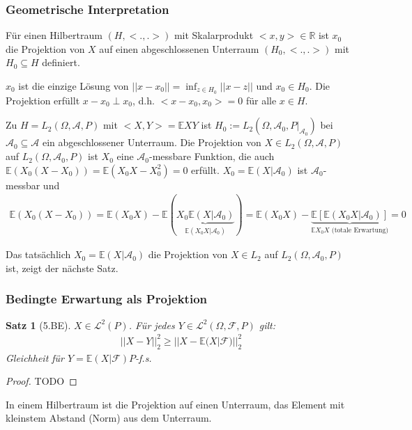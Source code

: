 \documentclass[]{article}
\newtheorem{theorem}{Satz}
\begin{document}
\subsubsection{Geometrische Interpretation}
Für einen Hilbertraum $(H, <.,.>)$ mit Skalarprodukt $<x,y>\in \mathbb{R}$ ist $x_0$ die Projektion von $X$ auf einen abgeschlossenen Unterraum $(H_0, <.,.>)$ mit $H_0\subseteq H$ definiert.

$x_0$ ist die einzige Lösung von $||x-x_0|| = \inf_{z\in H_0} ||x-z||$ und $x_0\in H_0$. Die Projektion erfüllt $x-x_0 \perp x_0$, d.h. $<x-x_0, x_0>=0$ für alle $x\in H$.

Zu $H=L_2(\Omega, \mathcal{A}, P)$ mit $<X,Y>=\mathbb{E}XY$ ist $H_0:=L_2(\Omega, \mathcal{A}_0, P|_{\mathcal{A}_0})$ bei $\mathcal{A}_0 \subseteq \mathcal{A}$ ein abgeschlossener Unterraum. Die Projektion von $X\in L_2(\Omega, \mathcal{A}, P)$ auf $L_2(\Omega, \mathcal{A}_0, P)$ ist $X_0$ eine $\mathcal{A}_0$-messbare Funktion, die auch $\mathbb{E}(X_0(X-X_0)) = \mathbb{E}(X_0X - X_0^2) = 0$ erfüllt. $X_0 =\mathbb{E}(X|\mathcal{A}_0)$ ist $\mathcal{A}_0$-messbar und
\begin{align*}
	\mathbb{E}(X_0(X-X_0)) = \mathbb{E}(X_0X) - \mathbb{E}(\underbrace{X_0\mathbb{E}(X|\mathcal{A}_0)}_{\mathbb{E}(X_0X|\mathcal{A}_0)}) = \mathbb{E}(X_0X) - \underbrace{\mathbb{E}[\mathbb{E}(X_0X|\mathcal{A}_0)]}_{\mathbb{E}X_0X \text{ (totale Erwartung)}} = 0
\end{align*}

Das tatsächlich $X_0 = \mathbb{E}(X|\mathcal{A}_0)$ die Projektion von $X\in L_2$ auf $L_2(\Omega, \mathcal{A}_0, P)$ ist, zeigt der nächste Satz.

\subsubsection{Bedingte Erwartung als Projektion}
\begin{theorem}[5.BE]
	$X\in \mathcal{L}^2(P)$. Für jedes $Y\in \mathcal{L}^2(\Omega, \mathcal{F}, P)$ gilt:
	\begin{align*}
		||X-Y||_2^2 \geq ||X-\mathbb{E}(X|\mathcal{F})||_2^2
	\end{align*}
	Gleichheit für $Y=\mathbb{E}(X|\mathcal{F}) P$-f.s.
\end{theorem}

\begin{proof}
	TODO
\end{proof}

In einem Hilbertraum ist die Projektion auf einen Unterraum, das Element mit kleinstem Abstand (Norm) aus dem Unterraum.
\end{document}

